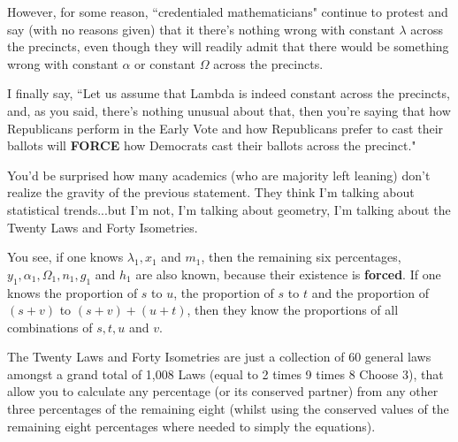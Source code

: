 \documentclass[preprint,13pt]{elsarticle}
\begin{document}
However, for some reason, ``credentialed mathematicians" continue to protest and say (with no reasons given) that it there's nothing wrong with constant $\lambda$ across the precincts, even though they will readily admit that there would be something wrong with constant $\alpha$ or constant $\Omega$ across the precincts.

I finally say, ``Let us assume that Lambda is indeed constant across the precincts, and, as you said, there's nothing unusual about that, then you're saying that how Republicans perform in the Early Vote and how Republicans prefer to cast their ballots will \textbf{FORCE} how Democrats cast their ballots across the precinct."

You'd be surprised how many academics (who are majority left leaning) don't realize the gravity of the previous statement. They think I'm talking about statistical trends...but I'm not, I'm talking about geometry, I'm talking about the Twenty Laws and Forty Isometries.

You see, if one knows $\lambda_{1},x_{1}$  and $m_{1}$, then the remaining six percentages, $y_{1}, \alpha_{1}, \Omega_{1}, n_{1}, g_{1}$ and $h_{1}$ are also known, because their existence is \textbf{forced}. If one knows the proportion of $s$ to $u$, the proportion of $s$ to $t$ and the proportion of $(s+v)$ to $(s+v)+(u+t)$, then they know the proportions of all combinations of $s,t,u$ and $v$.

The Twenty Laws and Forty Isometries are just a collection of 60 general laws amongst a grand total of 1,008 Laws (equal to 2 times 9 times 8 Choose 3), that allow you to calculate any percentage (or its conserved partner) from any other three percentages of the remaining eight (whilst using the conserved values of the remaining eight percentages where needed to simply the equations).
\end{document}
